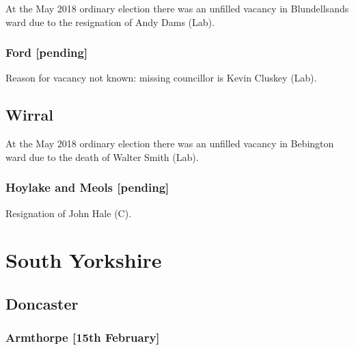 \documentclass[a4paper,openany]{book}
\begin{document}
\begin{resultsiii}
At the May 2018 ordinary election there was an unfilled vacancy in Blundellsands ward due to the resignation of Andy Dams (Lab).

\subsubsection*{Ford \hspace*{\fill}\nolinebreak[1]%
\enspace\hspace*{\fill}
[pending]}


Reason for vacancy not known: missing councillor is Kevin Cluskey (Lab).

\subsection*{Wirral}

At the May 2018 ordinary election there was an unfilled vacancy in Bebington ward due to the death of Walter Smith (Lab).

\subsubsection*{Hoylake and Meols \hspace*{\fill}\nolinebreak[1]%
\enspace\hspace*{\fill}
[pending]}


Resignation of John Hale (C).

\section{South Yorkshire}

\subsection*{Doncaster}

\subsubsection*{Armthorpe \hspace*{\fill}\nolinebreak[1]%
\enspace\hspace*{\fill}
[15th February]}


\end{resultsiii}
\end{document}
